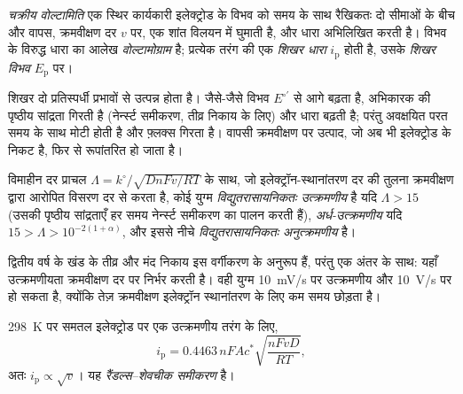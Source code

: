 \begin{definition}[चक्रीय वोल्टामिति]\label{def:b3:electrode-kinetics:cv}
\emph{चक्रीय वोल्टामिति} एक स्थिर कार्यकारी इलेक्ट्रोड के विभव को
समय के साथ रैखिकतः दो सीमाओं के बीच और वापस, क्रमवीक्षण दर $v$ पर, एक शांत विलयन में
घुमाती है, और धारा अभिलिखित करती है। विभव के विरुद्ध धारा का आलेख
\emph{वोल्टामोग्राम} है; प्रत्येक तरंग की एक
\emph{शिखर धारा} $i_{\mathrm p}$ होती है, उसके \emph{शिखर विभव}
$E_{\mathrm p}$ पर।
\end{definition}

शिखर दो प्रतिस्पर्धी प्रभावों से उत्पन्न होता है। जैसे-जैसे विभव $E^{\circ\prime}$ से आगे बढ़ता है,
अभिकारक की पृष्ठीय सांद्रता गिरती है (नेर्न्स्ट समीकरण, तीव्र
निकाय के लिए) और धारा बढ़ती है; परंतु अवक्षयित परत समय के साथ मोटी होती है और
फ़्लक्स गिरता है। वापसी क्रमवीक्षण पर उत्पाद, जो अब भी इलेक्ट्रोड के निकट है, फिर से
रूपांतरित हो जाता है।

\begin{definition}[उत्क्रमणीयता]\label{def:b3:electrode-kinetics:reversibility}
विमाहीन दर प्राचल $\Lambda = k^\circ/\sqrt{DnFv/RT}$ के साथ, जो
इलेक्ट्रॉन-स्थानांतरण दर की तुलना क्रमवीक्षण द्वारा आरोपित विसरण दर से करता है, कोई
युग्म \emph{विद्युतरासायनिकतः उत्क्रमणीय}
है यदि $\Lambda > 15$ (उसकी पृष्ठीय सांद्रताएँ हर समय नेर्न्स्ट समीकरण का
पालन करती हैं), \emph{अर्ध-उत्क्रमणीय} यदि $15 >
\Lambda > 10^{-2(1 + \alpha)}$, और इससे नीचे \emph{विद्युतरासायनिकतः अनुत्क्रमणीय}
है।
\end{definition}

\begin{remark}
द्वितीय वर्ष के खंड के तीव्र और मंद निकाय इस
वर्गीकरण के अनुरूप हैं, परंतु एक अंतर के साथ: यहाँ उत्क्रमणीयता क्रमवीक्षण
दर पर निर्भर करती है। वही युग्म \qty{10}{mV/s} पर उत्क्रमणीय और
\qty{10}{V/s} पर  हो सकता है, क्योंकि तेज़ क्रमवीक्षण इलेक्ट्रॉन स्थानांतरण के लिए कम समय छोड़ता है।
\end{remark}

\begin{proposition}[रैंडल्स--शेवचीक समीकरण]\label{prop:b3:electrode-kinetics:randles-sevcik}
\qty{298}{K} पर समतल इलेक्ट्रोड पर एक उत्क्रमणीय तरंग के लिए,
\[
  i_{\mathrm p} = 0.4463\,nFAc^*\sqrt{\frac{nFvD}{RT}},
\]
अतः $i_{\mathrm p} \propto \sqrt v$। यह \emph{रैंडल्स--शेवचीक समीकरण} है।
\end{proposition}

